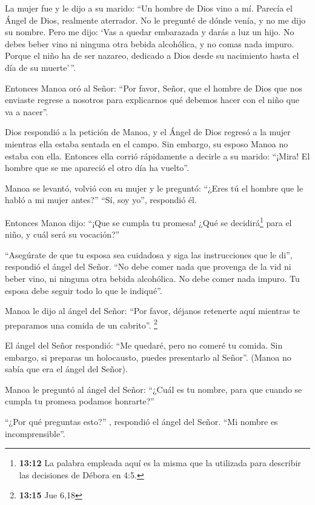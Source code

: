  La mujer fue y le dijo a su marido: ``Un hombre de Dios
vino a mí. Parecía el Ángel de Dios, realmente aterrador. No le pregunté
de dónde venía, y no me dijo su nombre.  Pero me dijo:
`Vas a quedar embarazada y darás a luz un hijo. No debes beber vino ni
ninguna otra bebida alcohólica, y no comas nada impuro. Porque el niño
ha de ser nazareo, dedicado a Dios desde su nacimiento hasta el día de
su muerte'\,''.

 Entonces Manoa oró al Señor: ``Por favor, Señor, que el
hombre de Dios que nos enviaste regrese a nosotros para explicarnos qué
debemos hacer con el niño que va a nacer''.

 Dios respondió a la petición de Manoa, y el Ángel de Dios
regresó a la mujer mientras ella estaba sentada en el campo. Sin
embargo, su esposo Manoa no estaba con ella.  Entonces
ella corrió rápidamente a decirle a su marido: ``¡Mira! El hombre que se
me apareció el otro día ha vuelto''.

 Manoa se levantó, volvió con su mujer y le preguntó:
``¿Eres tú el hombre que le habló a mi mujer antes?'' ``Sí, soy yo'',
respondió él.

 Entonces Manoa dijo: ``¡Que se cumpla tu promesa! ¿Qué
se decidirá\footnote{\textbf{13:12} La palabra empleada aquí es la misma
  que la utilizada para describir las decisiones de Débora en 4:5.} para
el niño, y cuál será su vocación?''

 ``Asegúrate de que tu esposa sea cuidadosa y siga las
instrucciones que le di'', respondió el ángel del Señor. 
``No debe comer nada que provenga de la vid ni beber vino, ni ninguna
otra bebida alcohólica. No debe comer nada impuro. Tu esposa debe seguir
todo lo que le indiqué''.

 Manoa le dijo al ángel del Señor: ``Por favor, déjanos
retenerte aquí mientras te preparamos una comida de un cabrito''.
\footnote{\textbf{13:15} Jue 6,18}

 El ángel del Señor respondió: ``Me quedaré, pero no
comeré tu comida. Sin embargo, si preparas un holocausto, puedes
presentarlo al Señor''. (Manoa no sabía que era el ángel del Señor).

 Manoa le preguntó al ángel del Señor: ``¿Cuál es tu
nombre, para que cuando se cumpla tu promesa podamos honrarte?''

 ``¿Por qué preguntas esto?'' , respondió el ángel del
Señor. ``Mi nombre es incomprensible''.

